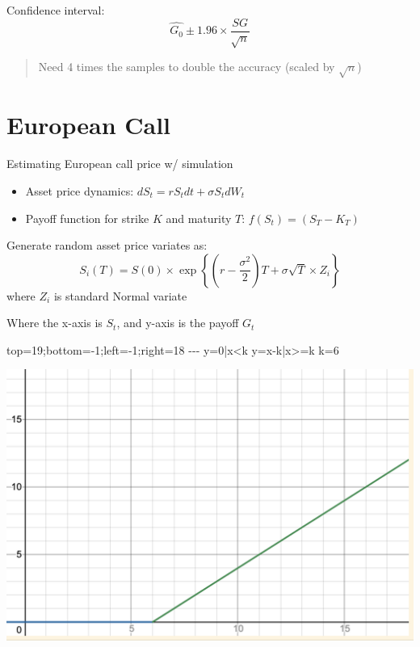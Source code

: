 \documentclass[
  oneside]{book}
\newenvironment{Shaded}{\begin{snugshade}}{\end{snugshade}}
\newcommand{\NormalTok}[1]{#1}
\providecommand{\tightlist}{%
  \setlength{\itemsep}{0pt}\setlength{\parskip}{0pt}}
\begin{document}
Confidence interval:
\[
\hat{G_{0}} \pm 1.96 \times \frac{SG}{\sqrt{ n }}
\]

\begin{quote}
Need 4 times the samples to double the accuracy (scaled by \(\sqrt{ n }\))
\end{quote}

\hypertarget{european-call}{%
\section{European Call}\label{european-call}}

Estimating European call price w/ simulation

\begin{itemize}
\tightlist
\item
  Asset price dynamics: \(dS_{t} = rS_{t}dt +\sigma S_{t}dW_{t}\)
\item
  Payoff function for strike \(K\) and maturity \(T\): \(f(S_{t})=(S_{T} - K_{T})\)
\end{itemize}

Generate random asset price variates as:
\[
S_i(T)=S(0) \times \exp \left\{\left(r-\frac{\sigma^2}{2}\right) T+\sigma \sqrt{T} \times Z_i\right\}
\]
where \(Z_i\) is standard Normal variate

Where the x-axis is \(S_t\), and y-axis is the payoff \(G_{t}\)

\begin{Shaded}
\begin{Highlighting}[]
\NormalTok{top=19;bottom={-}1;left={-}1;right=18}
\NormalTok{{-}{-}{-}}
\NormalTok{y=0|x\textless{}k}
\NormalTok{y=x{-}k|x\textgreater{}=k}
\NormalTok{k=6}
\end{Highlighting}
\end{Shaded}

\includegraphics{Notes/Obsidian-Attachments/10-Monte-Carlo-1.png}
\end{document}

